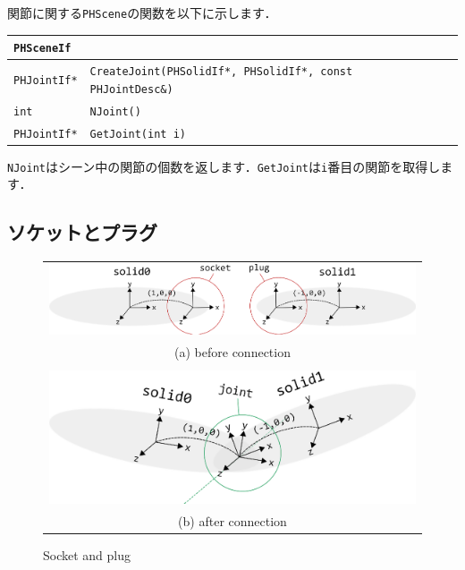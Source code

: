 \KLUDGE 関節に関する\texttt{PHScene}の関数を以下に示します．

\begin{center}
\begin{tabular}{p{.15\hsize}p{.75\hsize}p{.0\hsize}}
\multicolumn{3}{l}{\texttt{PHSceneIf}}													\\ \midrule
\texttt{PHJointIf*}	& \texttt{CreateJoint(PHSolidIf*, PHSolidIf*, const PHJointDesc\&)}	& \\
\texttt{int}		& \texttt{NJoint()}													& \\
\texttt{PHJointIf*}	& \texttt{GetJoint(int i)}											& \\
\end{tabular}
\end{center}

\texttt{NJoint}はシーン中の関節の個数を返します．\texttt{GetJoint}は\texttt{i}番目の関節を取得します．


\subsection*{ソケットとプラグ}

\begin{figure}[t]
\begin{center}
\begin{tabular}{c}
\includegraphics[clip, width=.5\hsize]{fig/socket_plug1.eps} \\
(a) before connection \\
\\
\includegraphics[clip, width=.5\hsize]{fig/socket_plug2.eps} \\
(b) after connection \\
\end{tabular}
\end{center}
\caption{Socket and plug}
\label{fig_socket_plug}
\end{figure}


